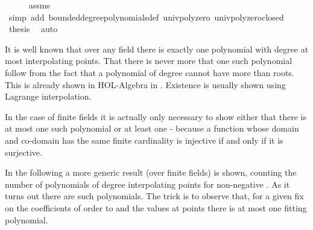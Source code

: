 \begin{isabellebody}
\ \ \ \ \isamarkupfalse%
\ assms\isanewline
\ \ \ \ \isamarkupfalse%
\ {\isacharparenleft}{\kern0pt}simp\ add{\isacharcolon}{\kern0pt}\ bounded{\isacharunderscore}{\kern0pt}degree{\isacharunderscore}{\kern0pt}polynomials{\isacharunderscore}{\kern0pt}def\ univ{\isacharunderscore}{\kern0pt}poly{\isacharunderscore}{\kern0pt}zero\ univ{\isacharunderscore}{\kern0pt}poly{\isacharunderscore}{\kern0pt}zero{\isacharunderscore}{\kern0pt}closed{\isacharparenright}{\kern0pt}\isanewline
\ \ \isamarkupfalse%
\ {\isacharquery}{\kern0pt}thesis\ \isamarkupfalse%
\ auto\isanewline
{}\isamarkupfalse%
%
\endisatagproof
{\isafoldproof}%
%
\isadelimproof
%
\endisadelimproof
%
\isadelimdocument
%
\endisadelimdocument
%
\isatagdocument
%
\isamarkuptrue%
%
\endisatagdocument
{\isafolddocument}%
%
\isadelimdocument
%
\endisadelimdocument
%
\begin{isamarkuptext}%
It is well known that over any field there is exactly one polynomial with degree at most
 interpolating   points. That there is never more that one such
polynomial follow from the fact that a polynomial of degree  cannot have more
than  roots. This is already shown in HOL-Algebra in
. Existence is usually shown using Lagrange interpolation.

In the case of finite fields it is actually only necessary to show either that there is at most one
such polynomial or at least one - because a function whose domain and co-domain has the same finite
cardinality is injective if and only if it is surjective.

In the following a more generic result (over finite fields) is shown, counting the 
number of polynomials of degree  interpolating  points for
non-negative . As it turns out there are  such polynomials.
The trick is to observe that, for a given fix on the coefficients of order  to 
 and the values at  points there is at most one fitting polynomial.


\end{isamarkuptext}
\end{isabellebody}
